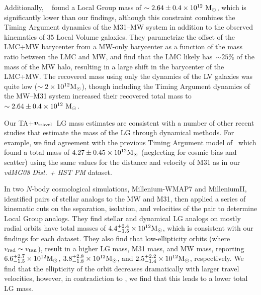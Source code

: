 \documentclass[twocolumn]{aastex631}
\newcommand{\bov}{\ensuremath{\boldsymbol{v}}}
\newcommand{\vtrav}{\ensuremath{\bov_{\rm travel}}}
\begin{document}
Additionally, ~\cite{Penarrubia2016} found a Local Group mass of
$\sim2.64\pm0.4\times 10^{12}~\mathrm{M}_\odot$, which is significantly lower than our
findings, although this constraint combines the Timing Argument dynamics of
the M31--MW system in addition to the observed kinematics of 35 Local Volume
galaxies. They parametrize the offset of the LMC+MW barycenter from a
MW-only barycenter as a function of the mass ratio between the LMC and MW, and
find that the LMC likely has~$\sim25\%$ of the mass of the MW halo, resulting in
a large shift in the barycenter of the LMC+MW.
The recovered mass using only the dynamics of the LV galaxies was quite low
($\sim 2\times 10^{12}\mathrm{M}_\odot$), though
including the Timing Argument dynamics of the MW--M31 system increased their
recovered total mass to $\sim2.64\pm0.4\times 10^{12}~\mathrm{M}_\odot$.

Our TA$+$\vtrav\  LG mass estimates are consistent with a number of other recent
studies that estimate the mass of the LG through dynamical methods.
For example, we find agreement with the previous Timing Argument model
of~\cite{vdm2012} which found a total mass
of $4.27\pm0.45\times 10^{12}\mathrm{M}_\odot$ (neglecting for cosmic bias and
scatter) using the same values for the distance and velocity of
M31 as in our \textit{vdMG08 Dist. + HST PM} dataset.

In two $N$-body cosmological simulations, Millenium-WMAP7 and MilleniumII,
\cite{Zhai2020} identified pairs of stellar analogs to the MW and M31, then
applied a series of kinematic cuts on the separation, isolation, and velocities
of the pair to determine Local Group analogs.
They find stellar and dynamical LG analogs on mostly radial orbits have total
masses of $4.4^{+2.4}_{-1.5}\times 10^{12}\mathrm{M}_\odot$, which is consistent with our
findings for each dataset.
They also find that low-ellipticity orbits (where
$v_{\rm rad}\sim v_{\rm tan}$), result in a higher LG mass, M31 mass, and MW
mass, reporting $6.6^{+2.7}_{-1.5}\times10^{12}\mathrm{M}_\odot$,
$3.8^{+2.8}_{-1.8}\times10^{12}\mathrm{M}_\odot$, and
$2.5^{+2.2}_{-1.4}\times10^{12}\mathrm{M}_\odot$, respectively.
We find that the ellipticity of the orbit decreases dramatically with larger
travel velocities, however, in contradiction to \cite{Zhai2020}, we find that
this leads to a lower total LG mass.
\end{document}
